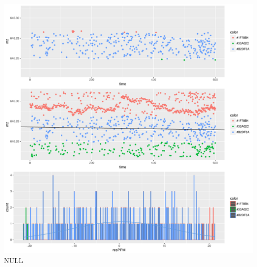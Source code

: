 \documentclass[]{article}
\begin{document}
\includegraphics{Supplementary_document_files/figure-latex/filter.lm.646-1.pdf}
NULL
\end{document}
